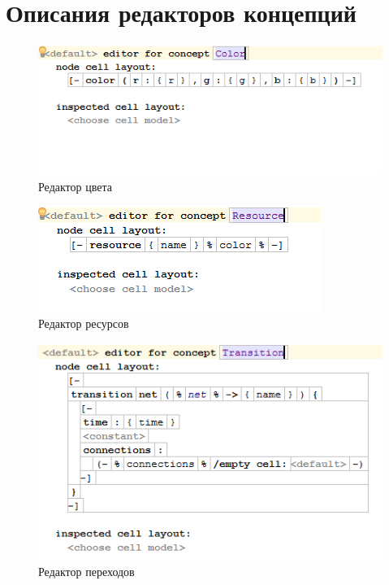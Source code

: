 









\chapter{Описания редакторов концепций} \label{AppendixC}

\begin{figure}[ht]
	\centering
	\includegraphics[width=0.7\linewidth]{images/editor/Color}
	\caption{Редактор цвета}
	\label{fig:color}
\end{figure}

\begin{figure}[ht]
	\centering
	\includegraphics[width=0.7\linewidth]{images/editor/Resource}
	\caption{Редактор ресурсов}
	\label{fig:resource}
\end{figure}

\begin{figure}[ht]
	\centering
	\includegraphics[width=0.7\linewidth]{images/editor/Transition}
	\caption{Редактор переходов}
	\label{fig:transition}
\end{figure}

